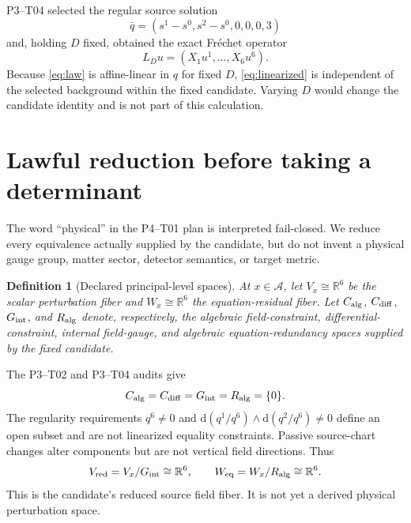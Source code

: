 \documentclass[11pt]{article}
\newcommand{\A}{\mathcal A}
\newcommand{\R}{\mathbb R}
\newcommand{\Vred}{V_{\mathrm{red}}}
\newcommand{\Eeq}{W_{\mathrm{eq}}}
\newtheorem{definition}{Definition}
\begin{document}
P3--T04 selected the regular source solution
\begin{equation}
 \bar q=(s^1-s^0,s^2-s^0,0,0,0,3)
 \label{eq:background}
\end{equation}
and, holding $D$ fixed, obtained the exact Fr\'echet operator
\begin{equation}
 L_Du=\left(X_1u^1,\ldots,X_6u^6\right).
 \label{eq:linearized}
\end{equation}
Because \eqref{eq:law} is affine-linear in $q$ for fixed $D$,
\eqref{eq:linearized} is independent of the selected background within the
fixed candidate.  Varying $D$ would change the candidate identity and is not
part of this calculation.

\section{Lawful reduction before taking a determinant}

The word ``physical'' in the P4--T01 plan is interpreted fail-closed.  We
reduce every equivalence actually supplied by the candidate, but do not invent
a physical gauge group, matter sector, detector semantics, or target metric.

\begin{definition}[Declared principal-level spaces]
At $x\in\A$, let $V_x\cong\R^6$ be the scalar perturbation fiber and
$W_x\cong\R^6$ the equation-residual fiber.  Let
$C_{\rm alg}$, $C_{\rm diff}$, $G_{\rm int}$, and $R_{\rm alg}$ denote,
respectively, the algebraic field-constraint, differential-constraint,
internal field-gauge, and algebraic equation-redundancy spaces supplied by the
fixed candidate.
\end{definition}

The P3--T02 and P3--T04 audits give
\begin{equation}
 C_{\rm alg}=C_{\rm diff}=G_{\rm int}=R_{\rm alg}=\{0\}.
 \label{eq:zeros}
\end{equation}
The regularity requirements $q^6\ne0$ and
$\mathrm d(q^1/q^6)\wedge\mathrm d(q^2/q^6)\ne0$ define an open subset and
are not linearized equality constraints.  Passive source-chart changes alter
components but are not vertical field directions.  Thus
\begin{equation}
 \Vred=V_x/G_{\rm int}\cong\R^6,
 \qquad
 \Eeq=W_x/R_{\rm alg}\cong\R^6.
 \label{eq:reducedspaces}
\end{equation}
This is the candidate's reduced source field fiber.  It is not yet a derived
physical perturbation space.
\end{document}
